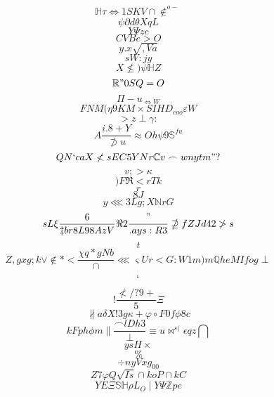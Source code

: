 \documentclass[12pt]{article}
\begin{document}
        \begin{minipage}[t][0pt]{\linewidth}

        \[\mathbb{H}\tau\iff 1 S K V\cap\notin^{o-}\]
\[\psi\partial d\theta X q L\]
\[Y\Psi z c\]
\[CVBe>O\]
\[y.x\sqrt{,Va}\]
\[sW:jy\]
\[X\nleq )\psi\mathbb{H} Z\]
\[\mathbb{R} " 0 S Q = O\]
\[\Pi - u_{\Leftrightarrow W}\]
\[FNM(\eta 9 K M\times S I H D_{coo}\varepsilon W\]
\[>z\perp\gamma :\]
\[A\frac{i.8+Y}{\not\supset u}\approx O h\psi 9\mathbb{S}^{fu}\]
\[QN`caX\nless s E C 5 Y N r\mathbb{C} v\frown w n y t m " ?\]
\[v;>\kappa\]
\[)F\Re < r T k\]
\[r\]
\[8J\]
\[y\lll 3 L g ; X\mathbb{N} {rG}\]
\[sL\xi\frac{6}{\ddagger b r 8 L 9 8 A z V}\Re 2\frac{"}{.ays:R3}\nsupseteq f Z J d 4 2\ngtr s\]
\[t\]
\[Z,gxg;k\lor\notin * <\frac{\chi q * g N b}{\cap}\lll\varsigma U r < G : W 1 m ) m\mathbb{Q} h e M I f o g\perp\]
\[`\]
\[!\frac{\nless / ? 9 +}{ 5}\Xi\]
\[\nparallel a\delta X ! 3 g\kappa +\varphi\circ F 0 f\phi 8 c\]
\[kFph\phi m\parallel\frac{\frown l D h 3}{\perp}\equiv u\bowtie^{s(}\epsilon q z\bigcap\]
\[ysH\times\]
\[\%\]
\[\div n y V x g_{00}\]
\[Z7\varphi Q\sqrt{Is}\cap k o P\cap k C\]
\[YE\Xi\mathbb{S}\mathbb{H}\rho L_{O}\mid Y\Psi\mathbb{Z} p { e}
        \]
\end{minipage}
\end{document}
